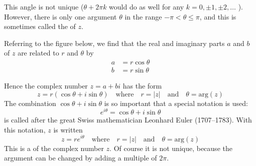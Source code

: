 \documentclass{ximera}
\begin{document}
This angle is not unique ($\theta + 2\pi k$ would do as well for any \newline $k = 0, \pm 1, \pm 2, \dots$ ). However, there is only one argument $\theta$ in the range $-\pi < \theta \leq \pi$, and this is sometimes called the  of $z$.

Referring to the figure below, we find that the real and imaginary parts $a$ and $b$ of $z$ are related to $r$ and $\theta$ by
\begin{align*}
a &= r \cos \theta \\
b &= r \sin \theta
\end{align*}

\begin{center}
\end{center}

Hence the complex number $z = a + bi$ has the form
\begin{equation*}
z = r(\cos \theta + i \sin \theta) \quad\mbox{where}\quad r = |z|\quad\mbox{and}\quad \theta = \mbox{arg}(z)
\end{equation*}
The combination $\cos \theta + i \sin \theta$ is so important that a special notation is used:
\begin{equation*}
e^{i\theta} = \cos \theta + i \sin \theta
\end{equation*}
is called  after the great Swiss mathematician Leonhard Euler (1707--1783). With this notation, $z$ is written
\begin{equation*}
z = r e^{i \theta} \quad\mbox{where}\quad r = |z|\quad\mbox{and}\quad \theta = \mbox{arg}(z)
\end{equation*}
This is a  of the complex number $z$. Of course it is not unique, because the argument can be changed by adding a multiple of $2\pi$.
\end{document}
